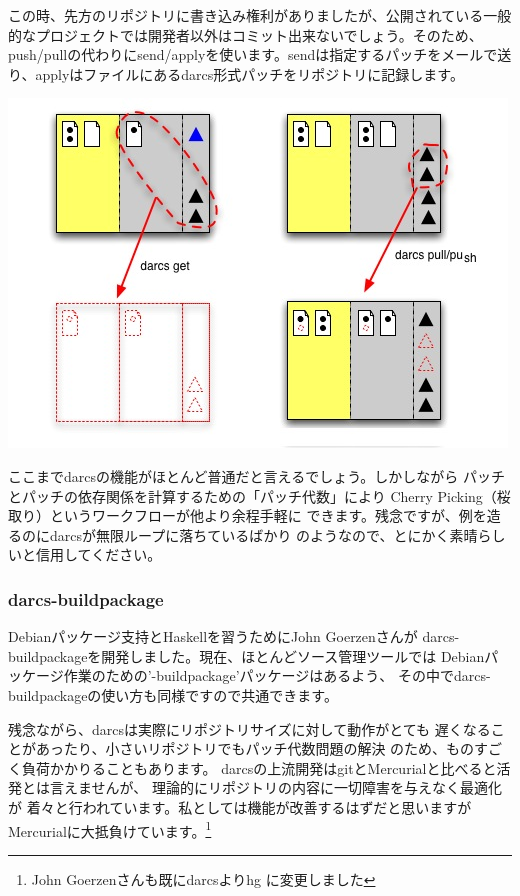 \documentclass[mingoth,a4paper]{jsarticle}
\begin{document}
この時、先方のリポジトリに書き込み権利がありましたが、公開されている一般
的なプロジェクトでは開発者以外はコミット出来ないでしょう。そのため、
push/pullの代わりにsend/applyを使います。sendは指定するパッチをメールで送
り、applyはファイルにあるdarcs形式パッチをリポジトリに記録します。

\includegraphics{image200704/darcs/pushpull.jpg}

ここまでdarcsの機能がほとんど普通だと言えるでしょう。しかしながら
パッチとパッチの依存関係を計算するための「パッチ代数」により
Cherry Picking（桜取り）というワークフローが他より余程手軽に
できます。残念ですが、例を造るのにdarcsが無限ループに落ちているばかり
のようなので、とにかく素晴らしいと信用してください。

\subsubsection{darcs-buildpackage}

Debianパッケージ支持とHaskellを習うためにJohn Goerzenさんが
darcs-buildpackageを開発しました。現在、ほとんどソース管理ツールでは
Debianパッケージ作業のための'-buildpackage'パッケージはあるよう、
その中でdarcs-buildpackageの使い方も同様ですので共通できます。

残念ながら、darcsは実際にリポジトリサイズに対して動作がとても
遅くなることがあったり、小さいリポジトリでもパッチ代数問題の解決
のため、ものすごく負荷かかりることもあります。
darcsの上流開発はgitとMercurialと比べると活発とは言えませんが、
理論的にリポジトリの内容に一切障害を与えなく最適化が
着々と行われています。私としては機能が改善するはずだと思いますが
Mercurialに大抵負けています。\footnote{John Goerzenさんも既にdarcsよりhg
に変更しました}
\end{document}

